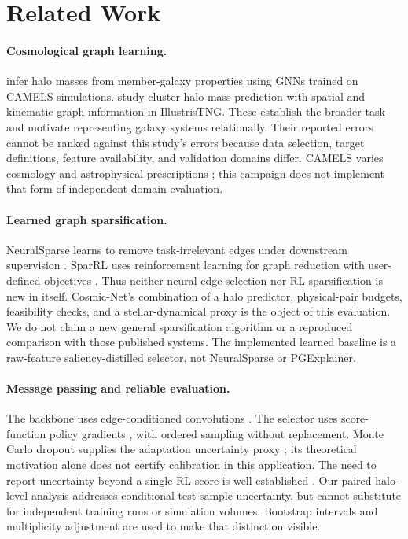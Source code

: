 \section{Related Work}
\paragraph{Cosmological graph learning.}
\citet{villanueva2022} infer halo masses from member-galaxy properties using GNNs trained on CAMELS simulations. \citet{garuda2024} study cluster halo-mass prediction with spatial and kinematic graph information in IllustrisTNG. These establish the broader task and motivate representing galaxy systems relationally. Their reported errors cannot be ranked against this study's errors because data selection, target definitions, feature availability, and validation domains differ. CAMELS varies cosmology and astrophysical prescriptions \citep{camels2021}; this campaign does not implement that form of independent-domain evaluation.

\paragraph{Learned graph sparsification.}
NeuralSparse learns to remove task-irrelevant edges under downstream supervision \citep{zheng2020}. SparRL uses reinforcement learning for graph reduction with user-defined objectives \citep{wickman2021}. Thus neither neural edge selection nor RL sparsification is new in itself. Cosmic-Net's combination of a halo predictor, physical-pair budgets, feasibility checks, and a stellar-dynamical proxy is the object of this evaluation. We do not claim a new general sparsification algorithm or a reproduced comparison with those published systems. The implemented learned baseline is a raw-feature saliency-distilled selector, not NeuralSparse or PGExplainer.

\paragraph{Message passing and reliable evaluation.}
The backbone uses edge-conditioned convolutions \citep{simonovsky2017}. The selector uses score-function policy gradients \citep{williams1992}, with ordered sampling without replacement. Monte Carlo dropout supplies the adaptation uncertainty proxy \citep{gal2016}; its theoretical motivation alone does not certify calibration in this application. The need to report uncertainty beyond a single RL score is well established \citep{agarwal2021}. Our paired halo-level analysis addresses conditional test-sample uncertainty, but cannot substitute for independent training runs or simulation volumes. Bootstrap intervals \citep{efron1987} and multiplicity adjustment \citep{holm1979} are used to make that distinction visible.
